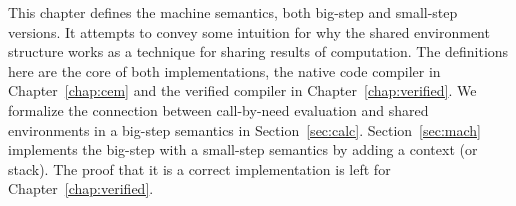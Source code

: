 This chapter defines the \ce machine semantics, both big-step and small-step
versions. It attempts to convey some intuition for why the shared environment
structure works as a technique for sharing results of computation. The
definitions here are the core of both implementations, the native code compiler
in Chapter~\ref{chap:cem} and the verified compiler in
Chapter~\ref{chap:verified}. We formalize the connection between call-by-need
evaluation and shared environments in a big-step semantics in
Section~\ref{sec:calc}. Section~\ref{sec:mach} implements the big-step with a
small-step semantics by adding a context (or stack). The proof that it is a
correct implementation is left for Chapter~\ref{chap:verified}.
